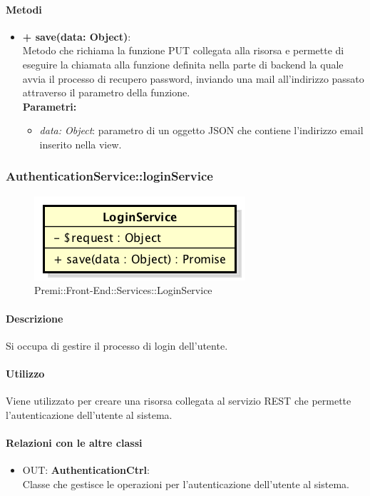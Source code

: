 		\paragraph{Metodi}
		\begin{itemize}
			\item \textbf{+ save(data: Object)}:\\
			Metodo che richiama la funzione PUT collegata alla risorsa e permette di eseguire la chiamata alla funzione definita nella parte di backend la quale avvia il processo di recupero password, inviando una mail all'indirizzo passato attraverso il parametro della funzione.\\
			\textbf{Parametri:}\\
			\begin{itemize}
				\item \textit{data: Object}: parametro di un oggetto \gls{JSON} che contiene l'indirizzo email inserito nella view.
			\end{itemize}
		\end{itemize}
\newpage
		
		
		\subsubsection{AuthenticationService::loginService}
		\begin{figure}[h]
			\centering
				\includegraphics[width=0.4\linewidth]{img/premi_front_end_services_loginservice}
			\caption[Premi::Front-End::Services::LoginService]{Premi::Front-End::Services::LoginService}
		\end{figure}
		
		\paragraph{Descrizione}
		Si occupa di gestire il processo di login dell'utente.
		
		\paragraph{Utilizzo}
		Viene utilizzato per creare una risorsa collegata al servizio \gls{REST} che permette l'autenticazione dell'utente al sistema.
		
		\paragraph{Relazioni con le altre classi}
		\begin{itemize}
			\item OUT: \textbf{AuthenticationCtrl}:\\
			Classe che gestisce le operazioni per l'autenticazione dell'utente al sistema.
		\end{itemize}
		
